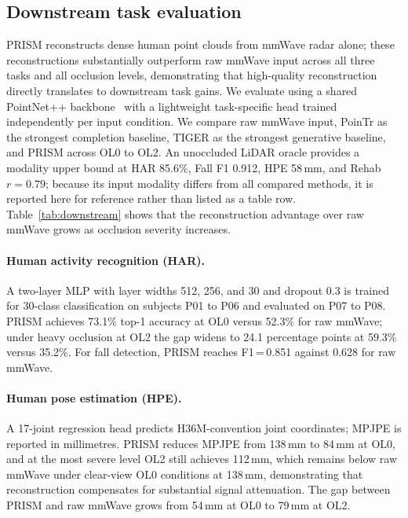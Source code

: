 \documentclass{article}
\begin{document}
\subsection{Downstream task evaluation}
\label{sec:downstream}

PRISM reconstructs dense human point clouds from mmWave radar alone; these
reconstructions substantially outperform raw mmWave input across all three tasks
and all occlusion levels, demonstrating that high-quality reconstruction directly
translates to downstream task gains.
We evaluate using a shared PointNet++ backbone~\cite{pointnet,qi2017pointnet2} with a
lightweight task-specific head trained independently per input condition.
We compare raw mmWave input, PoinTr as the strongest completion baseline, TIGER as
the strongest generative baseline, and PRISM across OL0 to OL2.
An unoccluded LiDAR oracle provides a modality upper bound at HAR 85.6\%, Fall F1
0.912, HPE 58\,mm, and Rehab $r\!=\!0.79$; because its input modality differs from
all compared methods, it is reported here for reference rather than listed as a table row.
Table~\ref{tab:downstream} shows that the reconstruction advantage over raw mmWave
grows as occlusion severity increases.

\paragraph{Human activity recognition (HAR).}
A two-layer MLP with layer widths 512, 256, and 30 and dropout 0.3 is trained for
30-class classification on subjects P01 to P06 and evaluated on P07 to P08.
PRISM achieves 73.1\% top-1 accuracy at OL0 versus 52.3\% for raw mmWave; under
heavy occlusion at OL2 the gap widens to 24.1 percentage points at 59.3\% versus
35.2\%.
For fall detection, PRISM reaches F1\,=\,0.851 against 0.628 for raw mmWave.

\paragraph{Human pose estimation (HPE).}
A 17-joint regression head predicts H36M-convention joint coordinates; MPJPE is
reported in millimetres.
PRISM reduces MPJPE from 138\,mm to 84\,mm at OL0, and at the most severe level OL2
still achieves 112\,mm, which remains below raw mmWave under clear-view OL0
conditions at 138\,mm, demonstrating that reconstruction compensates for substantial
signal attenuation.
The gap between PRISM and raw mmWave grows from 54\,mm at OL0 to 79\,mm at OL2.
\end{document}
